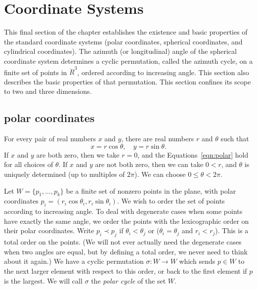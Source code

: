 \section{Coordinate Systems}

This final section of the chapter establishes the existence
and basic properties of the standard coordinate systems
(polar coordinates, spherical coordinates, and cylindrical
coordinates).  The azimuth (or longitudinal) angle of the
spherical coordinate system determines a cyclic permutation,
called the azimuth cycle,
on a finite set of points in $\ring{R}^3$, ordered according
to increasing angle.  This section also describes the basic
properties of that permutation.  This section confines its
scope to two and three dimensions.

\subsection{polar coordinates}
\label{sec:polar}



For every pair of real numbers $x$ and $y$,  there are real numbers
$r$ and $\theta$ such that
    \begin{equation}\label{eqn:polar}
    x = r\cos\theta,\quad y = r\sin\theta.
    \end{equation}
If $x$ and $y$ are both zero, then we take $r=0$, and the
Equations~\ref{eqn:polar} hold for all choices of $\theta$. If $x$
and $y$ are not both zero, then we can take $0<r$, and $\theta$ is
uniquely determined (up to multiples of $2\pi$).  We can choose
$0\le\theta < 2\pi$.

Let $W=\{p_1,\ldots,p_k\}$ be a finite set of
nonzero points in the plane, with
polar coordinates $p_i = (r_i\cos\theta_i,r_i\sin\theta_i)$.
We wish to order the set of points according to increasing angle.
To deal with degenerate cases when some points have exactly
the same angle,
we order the points with the lexicographic order on their
polar coordinates.  Write $p_i \prec p_j$ if
$\theta_i < \theta_j$ or ($\theta_i=\theta_j$ and $r_i<r_j$).
This is a total order on the points.  (We will not ever
actually need the degenerate cases when two angles are equal,
but by defining a total order, we never need to think about
it again.)
We have a cyclic permutation $\sigma:W\to W$ which sends
$p\in W$ to the next larger element with respect to this order,
or back to the first element if $p$ is the largest.
We will call $\sigma$ the {\it polar cycle}
of the set $W$.




